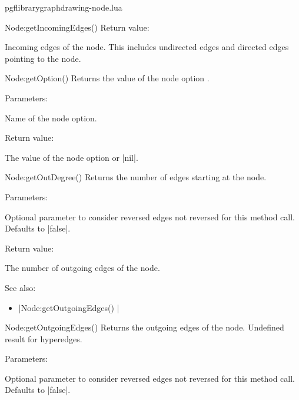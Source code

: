 \begin{filedescription}{pgflibrarygraphdrawing-node.lua}
\begin{luacommand}{{Node:getIncomingEdges}()}
Return value:
\begin{parameterdescription} 
  \item[] Incoming edges of the node. This includes undirected edges and directed edges pointing to the node. 
\end{parameterdescription}


\end{luacommand}
\begin{luacommand}{{Node:getOption}()}
Returns the value of the node option . 

Parameters:
\begin{parameterdescription}
	\item[\meta{name}] Name of the node option. 
\end{parameterdescription}


Return value:
\begin{parameterdescription} 
  \item[] The value of the node option  or |nil|. 
\end{parameterdescription}


\end{luacommand}
\begin{luacommand}{{Node:getOutDegree}()}
Returns the number of edges starting at the node. 

Parameters:
\begin{parameterdescription}
	\item[\meta{ignore\_reversed}] Optional parameter to consider reversed edges not reversed for this method call. Defaults to |false|. 
\end{parameterdescription}


Return value:
\begin{parameterdescription} 
  \item[] The number of outgoing edges of the node. 
\end{parameterdescription}


See also:
\begin{itemize}
	\item[] |Node:getOutgoingEdges() |
\end{itemize}

\end{luacommand}
\begin{luacommand}{{Node:getOutgoingEdges}()}
Returns the outgoing edges of the node. Undefined result for hyperedges. 

Parameters:
\begin{parameterdescription}
	\item[\meta{ignore\_reversed}] Optional parameter to consider reversed edges not reversed for this method call. Defaults to |false|. 
\end{parameterdescription}



\end{luacommand}
\end{filedescription}

